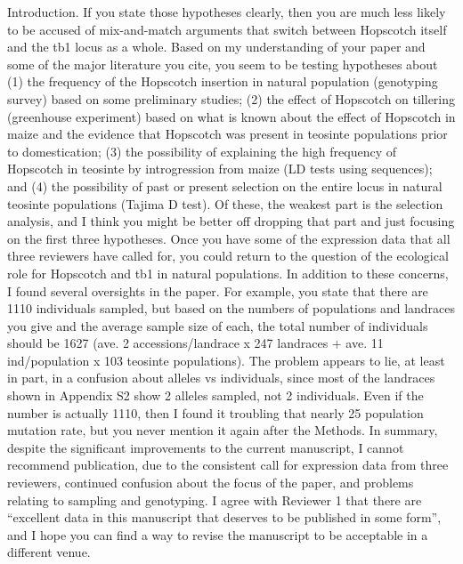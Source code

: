 \documentclass[11pt]{article}
\begin{document}
Introduction.  If you state those hypotheses clearly, then you are much less likely to be accused of mix-and-match arguments that switch between Hopscotch itself and the tb1 locus as a whole.  Based on my understanding of your paper and some of the major literature you cite, you seem to be testing hypotheses about (1) the frequency of the Hopscotch insertion in natural population (genotyping survey) based on some preliminary studies; (2) the effect of Hopscotch on tillering (greenhouse experiment) based on what is known about the effect of Hopscotch in maize and the evidence that Hopscotch was present in teosinte populations prior to domestication; (3) the possibility of explaining the high frequency of Hopscotch in teosinte by introgression from maize (LD tests using sequences); and (4) the possibility of past or present selection on the entire locus in natural teosinte populations (Tajima D test).  Of these, the weakest part is the selection analysis, and I think you might
be better off dropping that part and just focusing on the first three hypotheses.  Once you have some of the expression data that all three reviewers have called for, you could return to the question of the ecological role for Hopscotch and tb1 in natural populations.
    In addition to these concerns, I found several oversights in the paper.  For example, you state that there are 1110 individuals sampled, but based on the numbers of populations and landraces you give and the average sample size of each, the total number of individuals should be 1627 (ave. 2 accessions/landrace x 247 landraces + ave. 11 ind/population x 103 teosinte populations).  The problem appears to lie, at least in part, in a confusion about alleles vs individuals, since most of the landraces shown in Appendix S2 show 2 alleles sampled, not 2 individuals.  Even if the number is actually 1110, then I found it troubling that nearly 25%
population mutation rate, but you never mention it again after the Methods.
    In summary, despite the significant improvements to the current manuscript, I cannot recommend publication, due to the consistent call for expression data from three reviewers, continued confusion about the focus of the paper, and problems relating to sampling and genotyping.  I agree with Reviewer 1 that there are “excellent data in this manuscript that deserves to be published in some form”, and I hope you can find a way to revise the manuscript to be acceptable in a different venue.
\end{document}

